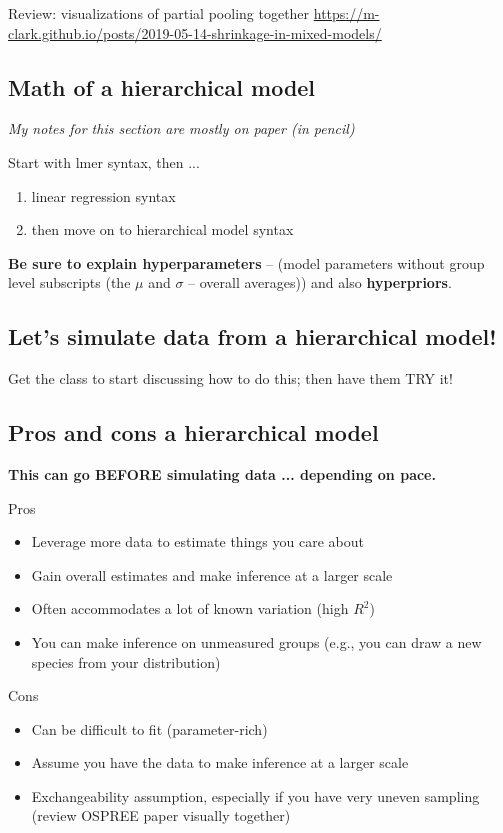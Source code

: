 \documentclass[11pt]{article}
\begin{document}
Review: visualizations of partial pooling together \url{https://m-clark.github.io/posts/2019-05-14-shrinkage-in-mixed-models/}

\subsection{Math of a hierarchical model}
\emph{My notes for this section are mostly on paper (in pencil)}

Start with lmer syntax, then ...
\begin{enumerate}
\item linear regression syntax
\item then move on to hierarchical model syntax
\end{enumerate}

{\bf Be sure to explain hyperparameters} -- (model parameters without group level subscripts (the $\mu$ and $\sigma$ -- overall averages)) and also {\bf hyperpriors}.

\subsection{Let's simulate data from a hierarchical model!}

Get the class to start discussing how to do this; then have them TRY it!


\subsection{Pros and cons a hierarchical model}
{\bf This can go BEFORE simulating data ... depending on pace.}

Pros
\begin{itemize}
\item Leverage more data to estimate things you care about
\item Gain overall estimates and make inference at a larger scale
\item Often accommodates a lot of known variation (high $R^2$)
\item You can make inference on unmeasured groups (e.g., you can draw a new species from your distribution)
\end{itemize}

Cons
\begin{itemize}
\item Can be difficult to fit (parameter-rich)
\item Assume you have the data to make inference at a larger scale
\item Exchangeability assumption, especially if you have very uneven sampling (review OSPREE paper visually together)
\end{itemize}
 
\end{document}
